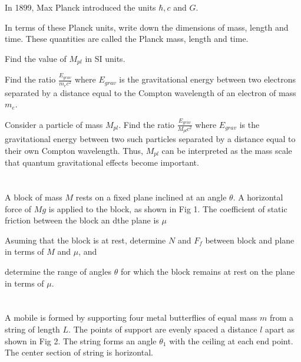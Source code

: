 \documentclass{article}
\title{}
\date{}
\newcommand{\<}{\langle}
\renewcommand{\>}{\rangle}
\begin{document}
\maketitle


\section{}

In 1899, Max Planck introduced the units $\hbar, c$ and $G$. 

In terms of these Planck units, write down the dimensions of mass, length and time. These quantities are called the Planck mass, length and time. 

Find the value of $M_{pl}$ in SI units. 

Find the ratio $\frac{E_{grav}}{m_e c^2}$ where $E_{grav}$ is the gravitational energy between two electrons separated by a distance equal to the Compton wavelength of an electron of mass $m_e$.

Consider a particle of mass $M_{pl}$. Find the ratio $\frac{E_{grav}}{M_{pl}c^2}$ where $E_{grav}$ is the gravitational energy between two such particles separated by a distance equal to their own Compton wavelength. Thus, $M_{pl}$ can be interpreted as the mass scale that quantum gravitational effects become important.

\section{}

A block of mass $M$ rests on a fixed plane inclined at an angle $\theta$. A horizontal force of $Mg$ is applied to the block, as shown in Fig 1. The coefficient of static friction between the block an dthe plane is $\mu$

Asuming that the block is at rest, determine $N$ and $F_f$ between block and plane in terms of $M$ and $\mu$, and

determine the range of angles $\theta$ for which the block remains at rest on the plane in terms of $\mu$.

\section{}

A mobile is formed by supporting four metal butterflies of equal mass $m$ from a string of length $L$. The points of support are evenly spaced a distance $l$ apart as shown in Fig 2. The string forms an angle $\theta_1$ with the ceiling at each end point. The center section of string is horizontal.
\end{document}
